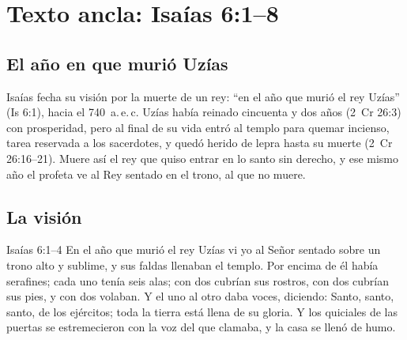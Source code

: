 
\section{Texto ancla: Isaías 6:1--8}

\subsection{El año en que murió Uzías}
Isaías fecha su visión por la muerte de un rey: ``en el año que murió el rey Uzías'' (Is 6:1), hacia el 740~a.\,e.\,c. Uzías había reinado cincuenta y dos años (2~Cr 26:3) con prosperidad, pero al final de su vida entró al templo para quemar incienso, tarea reservada a los sacerdotes, y quedó herido de lepra hasta su muerte (2~Cr 26:16--21). Muere así el rey que quiso entrar en lo santo sin derecho, y ese mismo año el profeta ve al Rey sentado en el trono, al que no muere.


\subsection{La visión}
\begin{verso}{Isaías 6:1–4}
En el año que murió el rey Uzías vi yo al Señor sentado sobre un trono alto y sublime, y sus faldas llenaban el templo. Por encima de él había serafines; cada uno tenía seis alas; con dos cubrían sus rostros, con dos cubrían sus pies, y con dos volaban. Y el uno al otro daba voces, diciendo: Santo, santo, santo, \SENOR{} de los ejércitos; toda la tierra está llena de su gloria. Y los quiciales de las puertas se estremecieron con la voz del que clamaba, y la casa se llenó de humo.
\end{verso}

